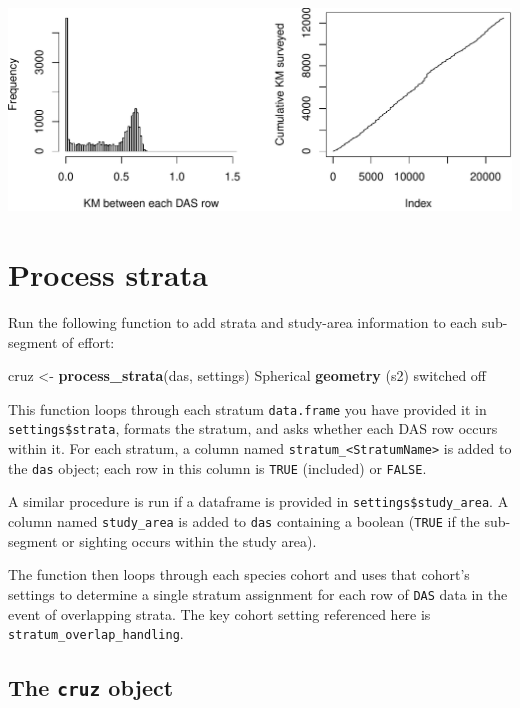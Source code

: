 \documentclass[
]{book}
\newenvironment{Shaded}{\begin{snugshade}}{\end{snugshade}}
\newcommand{\KeywordTok}[1]{\textcolor[rgb]{0.13,0.29,0.53}{\textbf{#1}}}
\newcommand{\NormalTok}[1]{#1}
\newcommand{\StringTok}[1]{\textcolor[rgb]{0.31,0.60,0.02}{#1}}
\begin{document}
\includegraphics{figures/unnamed-chunk-22-1.pdf}

\hypertarget{process-strata}{%
\section*{Process strata}\label{process-strata}}

Run the following function to add strata and study-area information to each sub-segment of effort:

\begin{Shaded}
\begin{Highlighting}[]
\NormalTok{cruz <-}\StringTok{ }\KeywordTok{process_strata}\NormalTok{(das, settings)}
\NormalTok{Spherical }\KeywordTok{geometry}\NormalTok{ (s2) switched off}
\end{Highlighting}
\end{Shaded}

This function loops through each stratum \texttt{data.frame} you have provided it in \texttt{settings\$strata}, formats the stratum, and asks whether each DAS row occurs within it. For each stratum, a column named \texttt{stratum\_\textless{}StratumName\textgreater{}} is added to the \texttt{das} object; each row in this column is \texttt{TRUE} (included) or \texttt{FALSE}.

A similar procedure is run if a dataframe is provided in \texttt{settings\$study\_area}. A column named \texttt{study\_area} is added to \texttt{das} containing a boolean (\texttt{TRUE} if the sub-segment or sighting occurs within the study area).

The function then loops through each species cohort and uses that cohort's settings to determine a single stratum assignment for each row of \texttt{DAS} data in the event of overlapping strata. The key cohort setting referenced here is \texttt{stratum\_overlap\_handling}.

\hypertarget{the-cruz-object}{%
\subsection*{\texorpdfstring{The \texttt{cruz} object}{The cruz object}}\label{the-cruz-object}}
\end{document}
